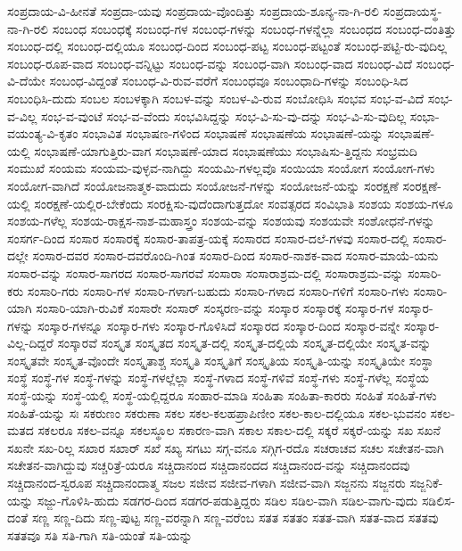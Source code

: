 {ಸಂಪ್ರದಾಯ-ವಿ-ಹೀನತೆ
ಸಂಪ್ರದಾ-ಯವು
ಸಂಪ್ರದಾಯ-ವೊಂದಿತ್ತು
ಸಂಪ್ರದಾಯ-ಶೂನ್ಯ-ನಾ-ಗಿ-ರಲಿ
ಸಂಪ್ರದಾಯಸ್ಥ-ನಾ-ಗಿ-ರಲಿ
ಸಂಬಂಧ
ಸಂಬಂಧಕ್ಕೆ
ಸಂಬಂಧ-ಗಳ
ಸಂಬಂಧ-ಗಳನ್ನು
ಸಂಬಂಧ-ಗಳನ್ನೆಲ್ಲಾ
ಸಂಬಂಧದ
ಸಂಬಂಧ-ದಂತಿತ್ತು
ಸಂಬಂಧ-ದಲ್ಲಿ
ಸಂಬಂಧ-ದಲ್ಲಿಯೂ
ಸಂಬಂಧ-ದಿಂದ
ಸಂಬಂಧ-ಪಟ್ಟ
ಸಂಬಂಧ-ಪಟ್ಟಂತೆ
ಸಂಬಂಧ-ಪಟ್ಟಿ-ರು-ವುದಿಲ್ಲ
ಸಂಬಂಧ-ರೂಪ-ವಾದ
ಸಂಬಂಧ-ವನ್ನಿಟ್ಟು
ಸಂಬಂಧ-ವನ್ನು
ಸಂಬಂಧ-ವಾಗಿ
ಸಂಬಂಧ-ವಾದ
ಸಂಬಂಧ-ವಿದೆ
ಸಂಬಂಧ-ವಿ-ದೆಯೇ
ಸಂಬಂಧ-ವಿದ್ದಂತೆ
ಸಂಬಂಧ-ವಿ-ರುವ-ವರೆಗೆ
ಸಂಬಂಧವೂ
ಸಂಬಂಧಾದಿ-ಗಳನ್ನು
ಸಂಬಂಧಿ-ಸಿದ
ಸಂಬಂಧಿಸಿ-ದುದು
ಸಂಬಲ
ಸಂಬಳಕ್ಕಾಗಿ
ಸಂಬಳ-ವನ್ನು
ಸಂಬಳ-ವಿ-ರುವ
ಸಂಬೋಧಿಸಿ
ಸಂಭವ
ಸಂಭ-ವ-ವಿದೆ
ಸಂಭ-ವ-ವಿಲ್ಲ
ಸಂಭ-ವ-ವುಂಟೆ
ಸಂಭ-ವ-ವೆಂದು
ಸಂಭವಿಸಿದ್ದನ್ನು
ಸಂಭ-ವಿ-ಸು-ವು-ದನ್ನು
ಸಂಭ-ವಿ-ಸು-ವುದಿಲ್ಲ
ಸಂಭಾ-ವಯಂತ್ಯ-ವಿ-ಕೃತಂ
ಸಂಭಾವಿತ
ಸಂಭಾಷಣ-ಗಳಿಂದ
ಸಂಭಾಷಣೆ
ಸಂಭಾಷಣೆಯ
ಸಂಭಾಷಣೆ-ಯನ್ನು
ಸಂಭಾಷಣೆ-ಯಲ್ಲಿ
ಸಂಭಾಷಣೆ-ಯಾಗುತ್ತಿರು-ವಾಗ
ಸಂಭಾಷಣೆ-ಯಾದ
ಸಂಭಾಷಣೆಯು
ಸಂಭಾಷಿಸು-ತ್ತಿದ್ದನು
ಸಂಭ್ರಮದಿ
ಸಂಮುಖೆ
ಸಂಯಮ
ಸಂಯಮ-ವುಳ್ಳವ-ನಾಗಿದ್ದು
ಸಂಯಮಿ-ಗಳಲ್ಲವೊ
ಸಂಯಿಯಾ
ಸಂಯೋಗ
ಸಂಯೋಗ-ಗಳು
ಸಂಯೋಗ-ವಾಗಿದೆ
ಸಂಯೋಜನಾತ್ಮಕ-ವಾದುದು
ಸಂಯೋಜನೆ-ಗಳನ್ನು
ಸಂಯೋಜನೆ-ಯನ್ನು
ಸಂರಕ್ಷಣೆ
ಸಂರಕ್ಷಣೆ-ಯಲ್ಲಿ
ಸಂರಕ್ಷಣೆ-ಯಲ್ಲಿರ-ಬೇಕೆಂದು
ಸಂರಕ್ಷಿಸು-ವುದೆಂದಾಗುತ್ತದೋ
ಸಂವತ್ಸರದ
ಸಂವಿಭಾತಿ
ಸಂಶಯ
ಸಂಶಯ-ಗಳೂ
ಸಂಶಯ-ಗಳೆಲ್ಲ
ಸಂಶಯ-ರಾಕ್ಷಸ-ನಾಶ-ಮಹಾಸ್ತ್ರಂ
ಸಂಶಯ-ವನ್ನು
ಸಂಶಯವು
ಸಂಶಯವೇ
ಸಂಶೋಧನೆ-ಗಳನ್ನು
ಸಂಸರ್ಗ-ದಿಂದ
ಸಂಸಾರ
ಸಂಸಾರಕ್ಕೆ
ಸಂಸಾರ-ತಾಪತ್ರ-ಯಕ್ಕೆ
ಸಂಸಾರದ
ಸಂಸಾರ-ದಲೆ-ಗಳವು
ಸಂಸಾರ-ದಲ್ಲಿ
ಸಂಸಾರ-ದಲ್ಲೇ
ಸಂಸಾರ-ದವರ
ಸಂಸಾರ-ದವರೊಂದಿ-ಗಿಂತ
ಸಂಸಾರ-ದಿಂದ
ಸಂಸಾರ-ನಾಶಕ-ವಾದ
ಸಂಸಾರ-ಮಾಯೆ-ಯನು
ಸಂಸಾರ-ವನ್ನು
ಸಂಸಾರ-ಸಾಗರದ
ಸಂಸಾರ-ಸಾಗರವೆ
ಸಂಸಾರಾ
ಸಂಸಾರಾಶ್ರಮ-ದಲ್ಲಿ
ಸಂಸಾರಾಶ್ರಮ-ವನ್ನು
ಸಂಸಾರಿ-ಕರು
ಸಂಸಾರಿ-ಗರು
ಸಂಸಾರಿ-ಗಳ
ಸಂಸಾರಿ-ಗಳಾಗ-ಬಹುದು
ಸಂಸಾರಿ-ಗಳಾದ
ಸಂಸಾರಿ-ಗಳಿಗೆ
ಸಂಸಾರಿ-ಗಳು
ಸಂಸಾರಿ-ಯಾಗಿ
ಸಂಸಾರಿ-ಯಾಗಿ-ರುವಿಕೆ
ಸಂಸಾರೇ
ಸಂಸಾರ್
ಸಂಸ್ಕರಣ-ವನ್ನು
ಸಂಸ್ಕಾರ
ಸಂಸ್ಕಾರಕ್ಕೆ
ಸಂಸ್ಕಾರ-ಗಳ
ಸಂಸ್ಕಾರ-ಗಳನ್ನು
ಸಂಸ್ಕಾರ-ಗಳನ್ನೂ
ಸಂಸ್ಕಾರ-ಗಳು
ಸಂಸ್ಕಾರ-ಗೊಳಿಸಿದೆ
ಸಂಸ್ಕಾರದ
ಸಂಸ್ಕಾರ-ದಿಂದ
ಸಂಸ್ಕಾರ-ವನ್ನೇ
ಸಂಸ್ಕಾರ-ವಿಲ್ಲ-ದಿದ್ದರೆ
ಸಂಸ್ಕಾರವೆ
ಸಂಸ್ಕೃತ
ಸಂಸ್ಕೃತದ
ಸಂಸ್ಕೃತ-ದಲ್ಲಿ
ಸಂಸ್ಕೃತ-ದಲ್ಲಿಯೆ
ಸಂಸ್ಕೃತ-ದಲ್ಲಿಯೇ
ಸಂಸ್ಕೃತ-ವನ್ನು
ಸಂಸ್ಕೃತವೇ
ಸಂಸ್ಕೃತ-ವೊಂದೇ
ಸಂಸ್ಕೃತಾಶ್ಚ
ಸಂಸ್ಕೃತಿ
ಸಂಸ್ಕೃತಿಗೆ
ಸಂಸ್ಕೃತಿಯ
ಸಂಸ್ಕೃತಿ-ಯನ್ನು
ಸಂಸ್ಕೃತಿಯೇ
ಸಂಸ್ಥಾ
ಸಂಸ್ಥೆ
ಸಂಸ್ಥೆ-ಗಳ
ಸಂಸ್ಥೆ-ಗಳನ್ನು
ಸಂಸ್ಥೆ-ಗಳಲ್ಲೆಲ್ಲಾ
ಸಂಸ್ಥೆ-ಗಳಾದ
ಸಂಸ್ಥೆ-ಗಳಿವೆ
ಸಂಸ್ಥೆ-ಗಳು
ಸಂಸ್ಥೆ-ಗಳೆಲ್ಲ
ಸಂಸ್ಥೆಯ
ಸಂಸ್ಥೆ-ಯನ್ನು
ಸಂಸ್ಥೆ-ಯಲ್ಲಿ
ಸಂಸ್ಥೆ-ಯಲ್ಲಿದ್ದರೂ
ಸಂಹಾರ-ಮಾಡಿ
ಸಂಹಿತಾ
ಸಂಹಿತಾ-ಕಾರರು
ಸಂಹಿತೆ
ಸಂಹಿತೆ-ಗಳು
ಸಂಹಿತೆ-ಯನ್ನು
ಸಃ
ಸಕರುಣಂ
ಸಕರುಣಾ
ಸಕಲ
ಸಕಲ-ಕಲಹಪ್ರಾಪಿಣೀಂ
ಸಕಲ-ಕಾಲ-ದಲ್ಲಿಯೂ
ಸಕಲ-ಭುವನಂ
ಸಕಲ-ಮತದ
ಸಕಲರೂ
ಸಕಲ-ವನ್ನೂ
ಸಕಲಸ್ಥೂಲ
ಸಕಾರಣ-ವಾಗಿ
ಸಕಾಲ
ಸಕಾಲ-ದಲ್ಲಿ
ಸಕ್ಕರೆ
ಸಕ್ಕರೆ-ಯನ್ನು
ಸಖ
ಸಖನೆ
ಸಖನೇ
ಸಖ-ರಿಲ್ಲ
ಸಖಾರ
ಸಖಾರ್
ಸಖೆ
ಸಖ್ಯ
ಸಗಟು
ಸಗ್ಗ-ವನೂ
ಸಗ್ಗಿಗ-ರದೊ
ಸಚರಾಚವ
ಸಚಲ
ಸಚೇತನ-ವಾಗಿ
ಸಚೇತನ-ವಾಗಿದ್ದುವು
ಸಚ್ಚರಿತ್ರೆ-ಯರೂ
ಸಚ್ಚಿದಾನಂದ
ಸಚ್ಚಿದಾನಂದದ
ಸಚ್ಚಿದಾನಂದ-ವನ್ನು
ಸಚ್ಚಿದಾನಂದವು
ಸಚ್ಚಿದಾನಂದ-ಸ್ವರೂಪ
ಸಚ್ಚಿದಾನಂದಾತ್ಮ
ಸಜಲ
ಸಜೀವ
ಸಜೀವ-ಗಳಾಗಿ
ಸಜೀವ-ವಾಗಿ
ಸಜ್ಜನನು
ಸಜ್ಜನರು
ಸಜ್ಜನಿಕೆ-ಯನ್ನು
ಸಜ್ಜು-ಗೊಳಿಸಿ-ಹುದು
ಸಡಗರ-ದಿಂದ
ಸಡಗರ-ಪಡುತ್ತಿದ್ದರು
ಸಡಿಲ
ಸಡಿಲ-ವಾಗಿ
ಸಡಿಲ-ವಾಗು-ವುದು
ಸಡಿಲಿಸ-ದಂತೆ
ಸಣ್ಣ
ಸಣ್ಣ-ದಿದು
ಸಣ್ಣ-ಪುಟ್ಟ
ಸಣ್ಣ-ವರನ್ನಾಗಿ
ಸಣ್ಣ-ವರೆಂಬ
ಸತತ
ಸತತಂ
ಸತತ-ವಾಗಿ
ಸತತ-ವಾದ
ಸತತವು
ಸತತವೂ
ಸತಿ
ಸತಿ-ಗಾಗಿ
ಸತಿ-ಯಂತೆ
ಸತಿ-ಯನ್ನು
}
